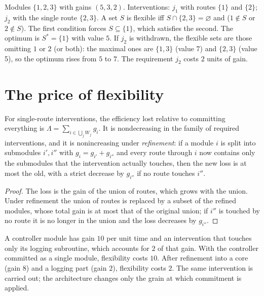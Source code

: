 \begin{example}\label{ex:three-modules}
Modules $\{1,2,3\}$ with gains $(5,3,2)$. Interventions: $j_1$ with routes $\{1\}$ and $\{2\}$; $j_2$ with the single route $\{2,3\}$. A set $S$ is flexible iff $S\cap\{2,3\}=\varnothing$ and ($1\notin S$ or $2\notin S$). The first condition forces $S\subseteq\{1\}$, which satisfies the second. The optimum is $S^*=\{1\}$ with value $5$. If $j_2$ is withdrawn, the flexible sets are those omitting $1$ or $2$ (or both): the maximal ones are $\{1,3\}$ (value 7) and $\{2,3\}$ (value 5), so the optimum rises from $5$ to $7$. The requirement $j_2$ costs $2$ units of gain.
\end{example}

\section{The price of flexibility}

\begin{newresult}\label{prop:flex-price}
For single-route interventions, the efficiency lost relative to committing everything is $\Lambda=\sum_{i\in\bigcup_jW_j}g_i$. It is nondecreasing in the family of required interventions, and it is nonincreasing under \emph{refinement}: if a module $i$ is split into submodules $i',i''$ with $g_i=g_{i'}+g_{i''}$ and every route through $i$ now contains only the submodules that the intervention actually touches, then the new loss is at most the old, with a strict decrease by $g_{i''}$ if no route touches $i''$.
\end{newresult}
\begin{proof}
The loss is the gain of the union of routes, which grows with the union. Under refinement the union of routes is replaced by a subset of the refined modules, whose total gain is at most that of the original union; if $i''$ is touched by no route it is no longer in the union and the loss decreases by $g_{i''}$.
\end{proof}

\begin{example}\label{ex:refine}
A controller module has gain $10$ per unit time and an intervention that touches only its logging subroutine, which accounts for $2$ of that gain. With the controller committed as a single module, flexibility costs $10$. After refinement into a core (gain $8$) and a logging part (gain $2$), flexibility costs $2$. The same intervention is carried out; the architecture changes only the grain at which commitment is applied.
\end{example}


